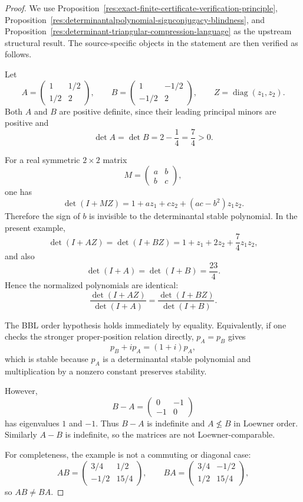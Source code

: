 \documentclass[11pt]{article}
\numberwithin{equation}{section}
\theoremstyle{definition}
\theoremstyle{remark}
\newcommand{\1}{\mathbf 1}
\begin{document}
\begin{proof}
We use Proposition~\ref{res:exact-finite-certificate-verification-principle}, Proposition~\ref{res:determinantalpolynomial-signconjugacy-blindness}, and Proposition~\ref{res:determinant-triangular-compression-language} as the upstream structural result. The source-specific objects in the statement are then verified as follows.

Let
\[
A=\begin{pmatrix}1&1/2\\[2pt]1/2&2\end{pmatrix},
\qquad
B=\begin{pmatrix}1&-1/2\\[2pt]-1/2&2\end{pmatrix},
\qquad
Z=\operatorname{diag}(z_1,z_2).
\]
Both \(A\) and \(B\) are positive definite, since their leading principal minors are positive and
\[
\det A=\det B=2-\frac14=\frac74>0.
\]

For a real symmetric \(2\times2\) matrix
\[
M=\begin{pmatrix}a&b\\ b&c\end{pmatrix},
\]
one has
\[
\det(I+MZ)=1+a z_1+c z_2+(ac-b^2)z_1z_2.
\]
Therefore the sign of \(b\) is invisible to the determinantal stable polynomial. In the present example,
\[
\det(I+AZ)=\det(I+BZ)=1+z_1+2z_2+\frac74 z_1z_2,
\]
and also
\[
\det(I+A)=\det(I+B)=\frac{23}{4}.
\]
Hence the normalized polynomials are identical:
\[
\frac{\det(I+AZ)}{\det(I+A)}
=
\frac{\det(I+BZ)}{\det(I+B)}.
\]

The BBL order hypothesis holds immediately by equality. Equivalently, if one checks the stronger proper-position relation directly, \(p_A=p_B\) gives
\[
p_B+i p_A=(1+i)p_A,
\]
which is stable because \(p_A\) is a determinantal stable polynomial and multiplication by a nonzero constant preserves stability.

However,
\[
B-A=
\begin{pmatrix}0&-1\\ -1&0\end{pmatrix}
\]
has eigenvalues \(1\) and \(-1\). Thus \(B-A\) is indefinite and \(A\nleq B\) in Loewner order. Similarly \(A-B\) is indefinite, so the matrices are not Loewner-comparable.

For completeness, the example is not a commuting or diagonal case:
\[
AB=\begin{pmatrix}3/4&1/2\\ -1/2&15/4\end{pmatrix},
\qquad
BA=\begin{pmatrix}3/4&-1/2\\ 1/2&15/4\end{pmatrix},
\]
so \(AB\ne BA\).


\end{proof}
\end{document}
